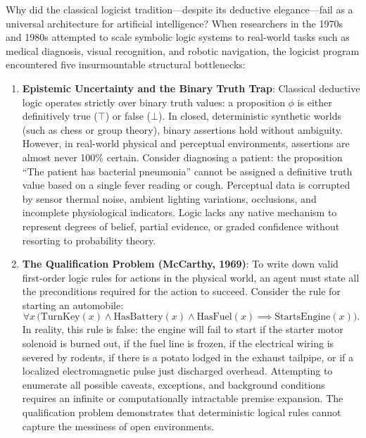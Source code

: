Why did the classical logicist tradition---despite its deductive elegance---fail as a universal architecture for artificial intelligence? When researchers in the 1970s and 1980s attempted to scale symbolic logic systems to real-world tasks such as medical diagnosis, visual recognition, and robotic navigation, the logicist program encountered five insurmountable structural bottlenecks:

\begin{enumerate}
  \item \textbf{Epistemic Uncertainty and the Binary Truth Trap}:
  Classical deductive logic operates strictly over binary truth values: a proposition $\phi$ is either definitively true ($\top$) or false ($\bot$). In closed, deterministic synthetic worlds (such as chess or group theory), binary assertions hold without ambiguity. However, in real-world physical and perceptual environments, assertions are almost never 100\% certain. Consider diagnosing a patient: the proposition ``The patient has bacterial pneumonia'' cannot be assigned a definitive truth value based on a single fever reading or cough. Perceptual data is corrupted by sensor thermal noise, ambient lighting variations, occlusions, and incomplete physiological indicators. Logic lacks any native mechanism to represent degrees of belief, partial evidence, or graded confidence without resorting to probability theory.

  \item \textbf{The Qualification Problem (McCarthy, 1969)}:
  To write down valid first-order logic rules for actions in the physical world, an agent must state all the preconditions required for the action to succeed. Consider the rule for starting an automobile:
  \begin{equation}
  \forall x \, \Big( \mathrm{TurnKey}(x) \wedge \mathrm{HasBattery}(x) \wedge \mathrm{HasFuel}(x) \implies \mathrm{StartsEngine}(x) \Big).
  \end{equation}
  In reality, this rule is false: the engine will fail to start if the starter motor solenoid is burned out, if the fuel line is frozen, if the electrical wiring is severed by rodents, if there is a potato lodged in the exhaust tailpipe, or if a localized electromagnetic pulse just discharged overhead. Attempting to enumerate all possible caveats, exceptions, and background conditions requires an infinite or computationally intractable premise expansion. The qualification problem demonstrates that deterministic logical rules cannot capture the messiness of open environments.


\end{enumerate}

